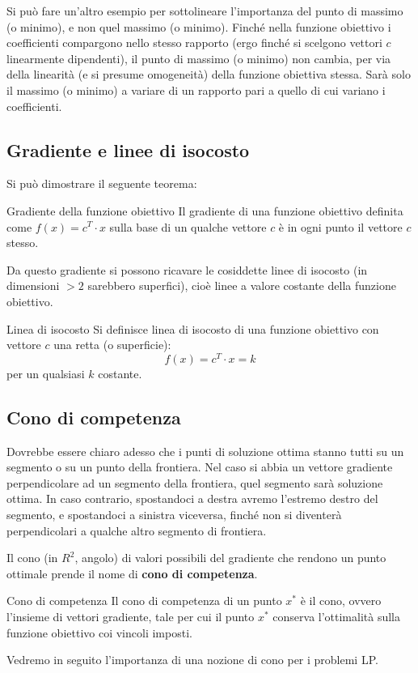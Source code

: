 \documentclass[a4paper,11pt]{article}
\begin{document}
Si può fare un'altro esempio per sottolineare l'importanza del punto di massimo (o minimo), e non quel massimo (o minimo).
Finché nella funzione obiettivo i coefficienti compargono nello stesso rapporto (ergo finché si scelgono vettori $c$ linearmente dipendenti), il punto di massimo (o minimo) non cambia, per via della linearità (e si presume omogeneità) della funzione obiettiva stessa.
Sarà solo il massimo (o minimo) a variare di un rapporto pari a quello di cui variano i coefficienti.

\subsection{Gradiente e linee di isocosto}
Si può dimostrare il seguente teorema:
\begin{theorem}{Gradiente della funzione obiettivo}
	Il gradiente di una funzione obiettivo definita come $ f(x) = c^T \cdot x $ sulla base di un qualche vettore $c$ è in ogni punto il vettore $c$ stesso.
\end{theorem}
Da questo gradiente si possono ricavare le cosiddette linee di isocosto (in dimensioni $>2$ sarebbero superfici), cioè linee a valore costante della funzione obiettivo.
\begin{definition}{Linea di isocosto}
	Si definisce linea di isocosto di una funzione obiettivo con vettore $c$ una retta (o superficie):	
	$$ f(x) = c^T \cdot x = k $$
	per un qualsiasi $k$ costante.
\end{definition}

\subsection{Cono di competenza}
Dovrebbe essere chiaro adesso che i punti di soluzione ottima stanno tutti su un segmento o su un punto della frontiera.
Nel caso si abbia un vettore gradiente perpendicolare ad un segmento della frontiera, quel segmento sarà soluzione ottima. In caso contrario, spostandoci a destra avremo l'estremo destro del segmento, e spostandoci a sinistra viceversa, finché non si diventerà perpendicolari a qualche altro segmento di frontiera.

Il cono (in $R^2$, angolo) di valori possibili del gradiente che rendono un punto ottimale prende il nome di \textbf{cono di competenza}.
\begin{definition}{Cono di competenza}
	Il cono di competenza di un punto $x^*$ è il cono, ovvero l'insieme di vettori gradiente, tale per cui il punto $x^*$ conserva l'ottimalità sulla funzione obiettivo coi vincoli imposti.
\end{definition}

Vedremo in seguito l'importanza di una nozione di cono per i problemi LP.
\end{document}
